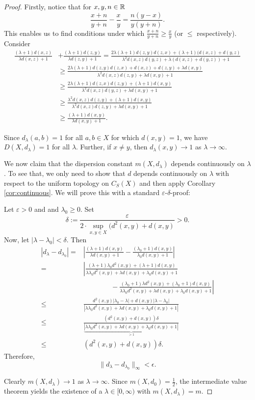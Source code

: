\begin{proof}
	Firstly, notice that for $x,y,n\in \mathbb{R}$\[
	\frac{x+n}{y+n}-\frac{x}{y}=\frac{n(y-x)}{y(y+n)}.
	\]
	This enables us to find conditions under which $\frac{x+n}{y+n}\geq\frac{x}{y}$ (or $\leq$ respectively).
	Consider
	\begin{align*}
		\frac{(\lambda+1)d(x,z)}{\lambda d(x,z)+1}&+\frac{(\lambda+1)d(z,y)}{\lambda d(z,y)+1}=\frac{2\lambda(\lambda+1)d(z,y)d(z,x)+(\lambda+1)(d(x,z)+d(y,z)}{\lambda^2d(x,z)d(y,z)+\lambda(d(x,z)+d(y,z))+1}\\
		&\geq\frac{2\lambda(\lambda+1)d(z,y)d(z,x)+d(x,z)+d(z,y)+\lambda d(x,y)}{\lambda^2d(x,z)d(z,y)+\lambda d(x,y)+1}\\
		&\geq \frac{2\lambda(\lambda+1)d(z,x)d(z,y)+(\lambda+1)d(x,y)}{\lambda^2d(x,z)d(y,z)+\lambda d(x,y)+1}\\
		&\geq \frac{\lambda^2d(x,z)d(z,y)+(\lambda+1)d(x,y)}{\lambda^2d(x,z)d(z,y)+\lambda d(x,y)+1}\\
		&\geq \frac{(\lambda+1)d(x,y)}{\lambda d(x,y)+1}.
	\end{align*}
	
	Since $d_\lambda(a,b)=1$ for all $a,b\in X$ for which $d(x,y)=1$, we have $D(X,d_\lambda)=1$ for all $\lambda$. Further, if $x\neq y$, then $d_\lambda(x,y)\to 1$ as $\lambda\to \infty$. 
	
	We now claim that the dispersion constant $m(X,d_\lambda)$ depends continuously on $\lambda$. To see that, we only need to show that $d$ depends continuously on $\lambda$ with respect to the uniform topology on $C_S(X)$ and then apply Corollary \ref{cor:continuous}.
	We will prove this with a standard $\varepsilon$-$\delta$-proof:
	
	Let $\varepsilon>0$ and and $\lambda_0\geq 0$. Set 
	\[\delta:=\frac{\varepsilon}{2\cdot \sup\limits_{x,y\in X}(d^2(x,y)+d(x,y)}>0.\]
	Now, let $|\lambda-\lambda_0|<\delta$.
	Then 
	\begin{align*}
		|d_\lambda-d_{\lambda_0}|=&\left|\frac{(\lambda+1)d(x,y)}{\lambda d(x,y)+1}-\frac{(\lambda_0+1)d(x,y)}{\lambda_0 d(x,y)+1}\right|
		\\
		=&\left|\frac{(\lambda+1)\lambda_0d^2(x,y)+(\lambda+1)d(x,y)}{\lambda\lambda_0d^2(x,y)+\lambda d(x,y)+\lambda_0d(x,y)+1}\right.
		\\
		&\qquad\qquad -\left.\frac{(\lambda_0+1)\lambda d^2(x,y)+(\lambda_0+1)d(x,y)}{{\lambda\lambda_0d^2(x,y)+\lambda d(x,y)+\lambda_0d(x,y)+1}}\right|
		\\
		\leq&\frac{d^2(x,y)|\lambda_0-\lambda|+d(x,y)|\lambda-\lambda_0|}{|\lambda\lambda_0 d^2(x,y)+\lambda d(x,y)+\lambda_0 d(x,y)+1|}
		\\
		\leq& \frac{(d^2(x,y)+d(x,y))\delta}{\underset{>1}{\underbrace{|\lambda\lambda_0 d^2(x,y)+\lambda d(x,y)+\lambda_0 d(x,y)+1|}}}
		\\
		\leq &(d^2(x,y)+d(x,y))\delta.
	\end{align*}
	Therefore,
	\[
	\|d_\lambda-d_{\lambda_0}\|_{\infty}< \epsilon.
	\]
	
	Clearly $m(X,d_\lambda)\to 1$ as $\lambda\to \infty$. Since $m(X,d_0)=\frac{1}{2}$, the intermediate value theorem yields the existence of a $\lambda\in [0,\infty)$ with $m(X,d_\lambda)=m$.
\end{proof}


